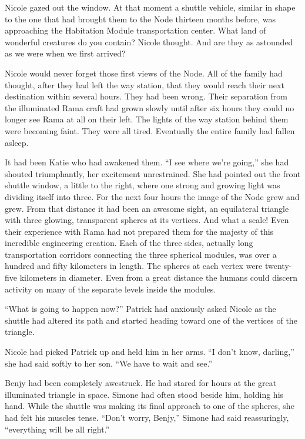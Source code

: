 \documentclass[]{article}
\begin{document}
{Nicole gazed out the window.  At that moment a shuttle vehicle, similar in shape to the one that had brought them to the Node thirteen months before, was approaching the Habitation Module transportation center.  What land of wonderful creatures do you contain? Nicole thought.  And are they as astounded as we were when we first arrived?

Nicole would never forget those first views of the Node.  All of the family had thought, after they had left the way station, that they would reach their next destination within several hours.  They had been wrong.  Their separation from the illuminated Rama craft had grown slowly until after six hours they could no longer see Rama at all on their left.  The lights of the way station behind them were becoming faint.  They were all tired.  Eventually the entire family had fallen asleep.

It had been Katie who had awakened them.  “I see where we’re going,” she had shouted triumphantly, her excitement unrestrained.  She had pointed out the front shuttle window, a little to the right, where one strong and growing light was dividing itself into three.  For the next four hours the image of the Node grew and grew.  From that distance it had been an awesome sight, an equilateral triangle with three glowing, transparent spheres at its vertices.  And what a scale! Even their experience with Rama had not prepared them for the majesty of this incredible engineering creation.  Each of the three sides, actually long transportation corridors connecting the three spherical modules, was over a hundred and fifty kilometers in length.  The spheres at each vertex were twenty-five kilometers in diameter.  Even from a great distance the humans could discern activity on many of the separate levels inside the modules.

“What is going to happen now?” Patrick had anxiously asked Nicole as the shuttle had altered its path and started heading toward one of the vertices of the triangle.

Nicole had picked Patrick up and held him in her arms.  “I don’t know, darling,” she had said softly to her son.  “We have to wait and see.”

Benjy had been completely awestruck.  He had stared for hours at the great illuminated triangle in space.  Simone had often stood beside him, holding his hand.  While the shuttle was making its final approach to one of the spheres, she had felt his muscles tense.  “Don’t worry, Benjy,” Simone had said reassuringly, “everything will be all right.”

}
\end{document}
